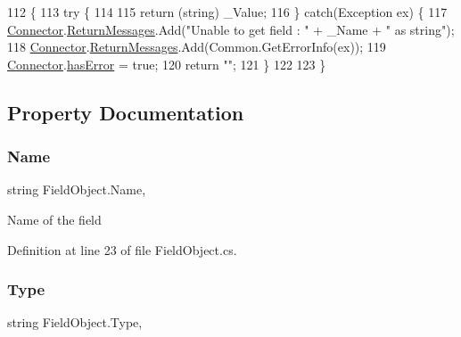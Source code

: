 \begin{DoxyCode}
112                                      \{
113         \textcolor{keywordflow}{try} \{
114 
115             \textcolor{keywordflow}{return} (\textcolor{keywordtype}{string}) \_Value;
116         \} \textcolor{keywordflow}{catch}(Exception ex) \{
117             \hyperlink{class_connector}{Connector}.\hyperlink{class_connector_a1ed422674b344524fd77998dcf6a9ba6}{ReturnMessages}.Add(\textcolor{stringliteral}{"Unable to get field : "} + \_Name + \textcolor{stringliteral}{" as
       string"});
118             \hyperlink{class_connector}{Connector}.\hyperlink{class_connector_a1ed422674b344524fd77998dcf6a9ba6}{ReturnMessages}.Add(Common.GetErrorInfo(ex));
119             \hyperlink{class_connector}{Connector}.\hyperlink{class_connector_a079bae21a5417efa53bfe8954c0f533f}{hasError} = \textcolor{keyword}{true};
120             \textcolor{keywordflow}{return} \textcolor{stringliteral}{""};
121         \}
122         
123     \}
\end{DoxyCode}


\subsection{Property Documentation}
\mbox{\label{class_field_object_ae5d972e96a3eca93407da8e8a89abfd1}} 
\subsubsection{\texorpdfstring{Name}{Name}}
{\footnotesize\ttfamily string Field\+Object.\+Name\hspace{0.3cm}{\ttfamily [get]}, {\ttfamily [set]}}



Name of the field 



Definition at line 23 of file Field\+Object.\+cs.

\mbox{\label{class_field_object_a370af2c26ae9c3e713b5d88b62a2a8f9}} 
\subsubsection{\texorpdfstring{Type}{Type}}
{\footnotesize\ttfamily string Field\+Object.\+Type\hspace{0.3cm}{\ttfamily [get]}, {\ttfamily [set]}}



